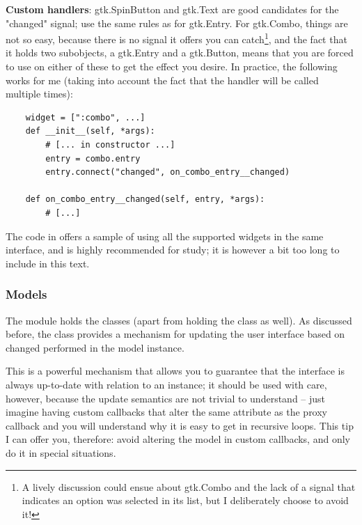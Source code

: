\documentclass[a4paper]{howto}
\begin{document}
\begin{itemize}
{\bf Custom handlers}: gtk.SpinButton and gtk.Text are good candidates for
the "changed" signal; use the same rules as for gtk.Entry. For gtk.Combo,
things are not so easy, because there is no signal it offers you can
catch\footnote{A lively discussion could ensue about gtk.Combo and the
lack of a signal that indicates an option was selected in its list, but
I deliberately choose to avoid it!}, and the fact that it holds two
subobjects, a gtk.Entry and a gtk.Button, means that you are forced to use
 on either of these to get the effect you desire. In
practice, the following works for me (taking into account the fact that
the handler will be called multiple times):

    \begin{verbatim}
    widget = [":combo", ...]
    def __init__(self, *args):
        # [... in constructor ...]
        entry = combo.entry
        entry.connect("changed", on_combo_entry__changed)

    def on_combo_entry__changed(self, entry, *args):
        # [...]
    \end{verbatim}

\end{itemize}

The code in  offers a sample of using all the
supported widgets in the same interface, and is highly recommended for
study; it is however a bit too long to include in this text.

\subsubsection{Models}

The  module holds the  classes (apart
from holding the  class as well). As discussed
before, the  class provides a mechanism for updating the
user interface based on changed performed in the model instance.

This is a powerful mechanism that allows you to guarantee that the
interface is always up-to-date with relation to an instance; it should
be used with care, however, because the update semantics are not trivial
to understand -- just imagine having custom callbacks that alter the
same attribute as the proxy callback and you will understand why it is
easy to get in recursive loops. This tip I can offer you, therefore:
avoid altering the model in custom callbacks, and only do it in special
situations.
\end{document}
